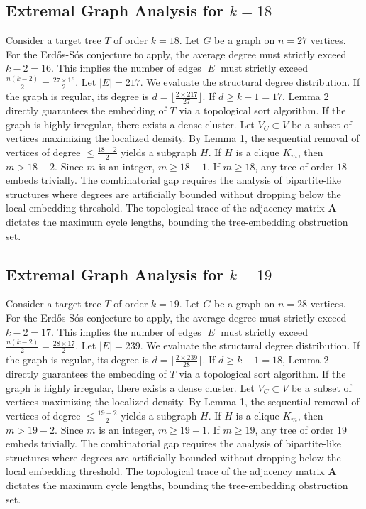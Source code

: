 \documentclass[11pt,a4paper]{article}
\begin{document}
\subsection{Extremal Graph Analysis for $k=18$}
Consider a target tree $T$ of order $k=18$.
Let $G$ be a graph on $n=27$ vertices.
For the Erd\H{o}s-S\'os conjecture to apply, the average degree must strictly exceed $k-2 = 16$.
This implies the number of edges $|E|$ must strictly exceed $\frac{n(k-2)}{2} = \frac{27 \times 16}{2}$.
Let $|E| = 217$.
We evaluate the structural degree distribution. If the graph is regular, its degree is $d = \lfloor \frac{2 \times 217}{27} \rfloor$.
If $d \geq k-1 = 17$, Lemma 2 directly guarantees the embedding of $T$ via a topological sort algorithm.
If the graph is highly irregular, there exists a dense cluster. Let $V_C \subset V$ be a subset of vertices maximizing the localized density.
By Lemma 1, the sequential removal of vertices of degree $\leq \frac{18-2}{2}$ yields a subgraph $H$.
If $H$ is a clique $K_{m}$, then $m > 18-2$. Since $m$ is an integer, $m \geq 18-1$. If $m \geq 18$, any tree of order $18$ embeds trivially.
The combinatorial gap requires the analysis of bipartite-like structures where degrees are artificially bounded without dropping below the local embedding threshold. The topological trace of the adjacency matrix $\mathbf{A}$ dictates the maximum cycle lengths, bounding the tree-embedding obstruction set.


\subsection{Extremal Graph Analysis for $k=19$}
Consider a target tree $T$ of order $k=19$.
Let $G$ be a graph on $n=28$ vertices.
For the Erd\H{o}s-S\'os conjecture to apply, the average degree must strictly exceed $k-2 = 17$.
This implies the number of edges $|E|$ must strictly exceed $\frac{n(k-2)}{2} = \frac{28 \times 17}{2}$.
Let $|E| = 239$.
We evaluate the structural degree distribution. If the graph is regular, its degree is $d = \lfloor \frac{2 \times 239}{28} \rfloor$.
If $d \geq k-1 = 18$, Lemma 2 directly guarantees the embedding of $T$ via a topological sort algorithm.
If the graph is highly irregular, there exists a dense cluster. Let $V_C \subset V$ be a subset of vertices maximizing the localized density.
By Lemma 1, the sequential removal of vertices of degree $\leq \frac{19-2}{2}$ yields a subgraph $H$.
If $H$ is a clique $K_{m}$, then $m > 19-2$. Since $m$ is an integer, $m \geq 19-1$. If $m \geq 19$, any tree of order $19$ embeds trivially.
The combinatorial gap requires the analysis of bipartite-like structures where degrees are artificially bounded without dropping below the local embedding threshold. The topological trace of the adjacency matrix $\mathbf{A}$ dictates the maximum cycle lengths, bounding the tree-embedding obstruction set.
\end{document}
